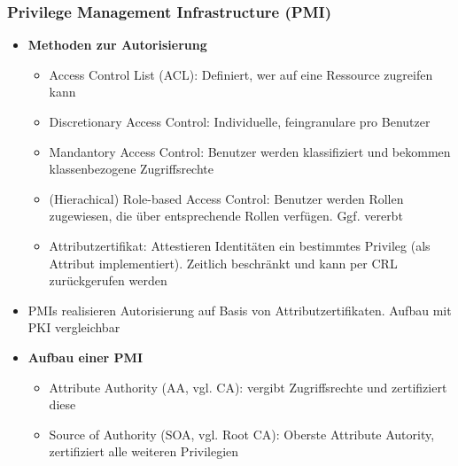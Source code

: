 \subsubsection{Privilege Management Infrastructure (PMI)}
\begin{itemize}
	\item \textbf{Methoden zur Autorisierung}
	\begin{itemize}
		\item Access Control List (ACL): Definiert, wer auf eine Ressource zugreifen kann
		\item Discretionary Access Control: Individuelle, feingranulare pro Benutzer
		\item Mandantory Access Control: Benutzer werden klassifiziert und bekommen klassenbezogene Zugriffsrechte
		\item (Hierachical) Role-based Access Control: Benutzer werden Rollen zugewiesen, die über entsprechende Rollen verfügen. Ggf. vererbt
		\item Attributzertifikat: Attestieren Identitäten ein bestimmtes Privileg (als Attribut implementiert). Zeitlich beschränkt und kann per CRL zurückgerufen werden
	\end{itemize}
	\item PMIs realisieren Autorisierung auf Basis von Attributzertifikaten. Aufbau mit PKI vergleichbar
	\item \textbf{Aufbau einer PMI}
	\begin{itemize}
		\item Attribute Authority (AA, vgl. CA): vergibt Zugriffsrechte und zertifiziert diese
		\item Source of Authority (SOA, vgl. Root CA): Oberste Attribute Autority, zertifiziert alle weiteren Privilegien
	\end{itemize}
\end{itemize}


